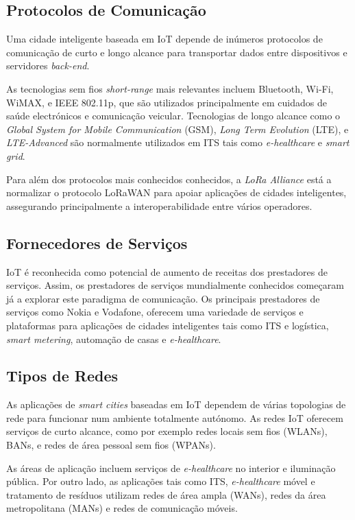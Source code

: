 \documentclass{llncs}
\begin{document}
    
    \subsection{Protocolos de Comunicação}
    \par Uma cidade inteligente baseada em IoT depende de inúmeros protocolos de
    comunicação de curto e longo alcance 
    para transportar dados entre dispositivos e servidores \textit{back-end}. 
    \par As tecnologias sem fios \textit{short-range} mais relevantes incluem 
    Bluetooth, Wi-Fi, WiMAX, e IEEE 802.11p, que são utilizados principalmente em
    cuidados de saúde electrónicos e comunicação veicular. 
    Tecnologias de longo alcance como o \textit{Global System for Mobile 
    Communication} (GSM), \textit{Long Term Evolution} (LTE), e 
    \textit{LTE-Advanced} são normalmente utilizados em ITS tais como 
    \textit{e-healthcare} e \textit{smart grid}. 
    \par Para além dos protocolos mais conhecidos conhecidos, 
    a \textit{LoRa Alliance} está a normalizar o protocolo LoRaWAN para apoiar
    aplicações de cidades inteligentes, 
    assegurando principalmente a interoperabilidade entre vários operadores. 

    
    \subsection{Fornecedores de Serviços}
    IoT é reconhecida como potencial de aumento de receitas dos
    prestadores de serviços. Assim, os prestadores de serviços mundialmente 
    conhecidos começaram já a explorar este paradigma de comunicação.
    Os principais prestadores de serviços como Nokia e Vodafone, oferecem uma
    variedade de serviços e plataformas para aplicações de cidades inteligentes
    tais como ITS e logística, \textit{smart metering}, automação de casas e \textit{e-healthcare}.

    
    \subsection{Tipos de Redes}
    \par As aplicações de \textit{smart cities} baseadas em IoT dependem 
    de várias topologias de rede para funcionar num ambiente totalmente autónomo.
    As redes IoT oferecem serviços de curto alcance, como por exemplo redes locais sem fios (WLANs),
    BANs, e redes de área pessoal sem fios (WPANs). 
    \par As áreas de aplicação incluem
    serviços de \textit{e-healthcare} no interior e iluminação pública. Por outro lado, as
    aplicações tais como ITS, \textit{e-healthcare} móvel e tratamento de resíduos
    utilizam redes de área ampla (WANs), redes da área metropolitana (MANs) e redes de comunicação
    móveis. 
\end{document}
